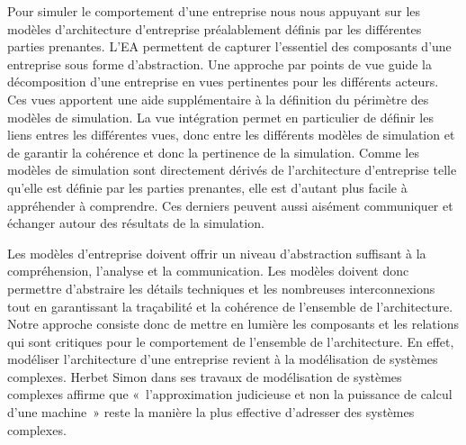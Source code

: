 Pour simuler le comportement d'une entreprise nous nous appuyant sur les modèles d'architecture d'entreprise préalablement définis par les différentes parties prenantes. L'EA permettent de capturer l'essentiel des composants d'une entreprise sous forme d'abstraction. Une approche par points de vue guide la décomposition d'une entreprise en vues pertinentes pour les différents acteurs. Ces vues apportent une aide supplémentaire à la définition du périmètre des modèles de simulation. La vue intégration permet en particulier de définir les liens entres les différentes vues, donc entre les différents modèles de simulation et de garantir la cohérence et donc la pertinence de la simulation. Comme les modèles de simulation sont directement dérivés de l'architecture d'entreprise telle qu'elle est définie par les parties prenantes, elle est d'autant plus facile à appréhender à comprendre. Ces derniers peuvent aussi aisément communiquer et échanger autour des résultats de la simulation. 

Les modèles d'entreprise doivent offrir un niveau d'abstraction suffisant à la compréhension, l'analyse et la communication. Les modèles doivent donc permettre d'abstraire les détails techniques et les nombreuses interconnexions tout en garantissant la traçabilité et la cohérence de l'ensemble de l'architecture. Notre approche consiste donc de mettre en lumière les composants et les relations qui sont critiques pour le comportement de l'ensemble de l'architecture. En effet, modéliser l'architecture d'une entreprise revient à la modélisation de systèmes complexes. Herbet Simon \cite{simon1990prediction} dans ses travaux de modélisation de systèmes complexes affirme que «~l'approximation judicieuse et non la puissance de calcul d'une machine~» reste la manière la plus effective d'adresser des systèmes complexes.

